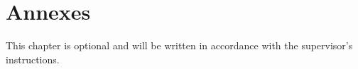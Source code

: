\chapter{Annexes}
This chapter is optional and will be written in accordance with the supervisor's instructions.
